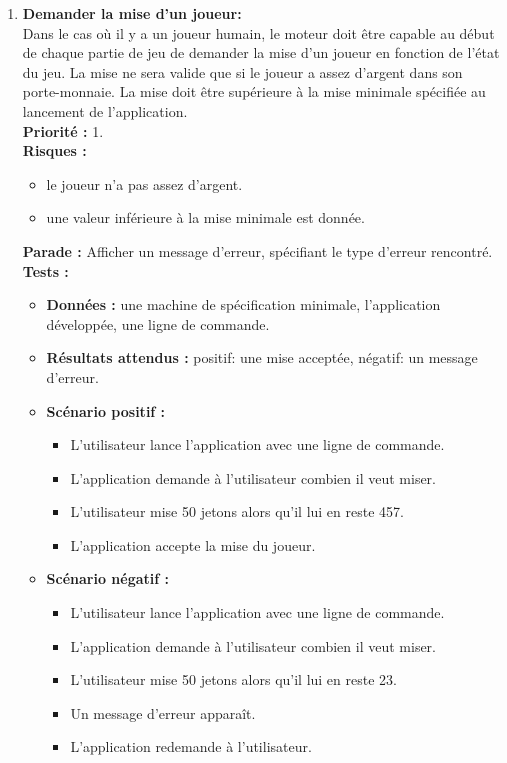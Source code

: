 \documentclass{article}
\begin{document}
\begin{enumerate}
    \item \textbf{Demander la mise d'un joueur:}\\
    Dans le cas où il y a un joueur humain, le moteur doit être capable au début de chaque partie de jeu de demander la mise d'un joueur en fonction de l'état du jeu. La mise ne sera valide que si le joueur a assez d'argent dans son porte-monnaie. La mise doit être supérieure à la mise minimale spécifiée au lancement de l'application. \\
    \textbf{Priorité :} 1. \\
    \textbf{Risques :} 
    \begin{itemize}
        \item le joueur n'a pas assez d'argent.
        \item une valeur inférieure à la mise minimale est donnée.
    \end{itemize}
    \textbf{Parade :} Afficher un message d'erreur, spécifiant le type d'erreur rencontré.\\
    \textbf{Tests :}
    \begin{itemize}
        \item \textbf{Données :} une machine de spécification minimale, l'application développée, une ligne de commande.
        \item \textbf{Résultats attendus :} positif: une mise acceptée, négatif: un message d'erreur.
        \item \textbf{Scénario positif :}
        \begin{itemize}
            \item L'utilisateur lance l'application avec une ligne de commande.
            \item L'application demande à l'utilisateur combien il veut miser.
            \item L'utilisateur mise 50 jetons alors qu'il lui en reste 457.
            \item L'application accepte la mise du joueur.
        \end{itemize}
        \item \textbf{Scénario négatif :}
        \begin{itemize}
            \item L'utilisateur lance l'application avec une ligne de commande.
            \item L'application demande à l'utilisateur combien il veut miser.
            \item L'utilisateur mise 50 jetons alors qu'il lui en reste 23.
            \item Un message d'erreur apparaît.
            \item L'application redemande à l'utilisateur.
        \end{itemize}
    \end{itemize}
    

\end{enumerate}
\end{document}
